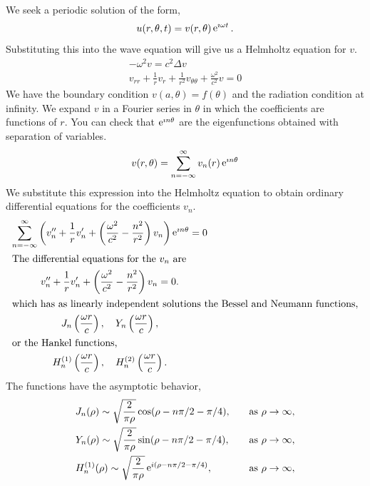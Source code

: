 {%
\begin{Solution}
  We seek a periodic solution of the form,
  \[
  u(r, \theta, t) = v(r, \theta) \mathop{\mathrm{e}}\nolimits^{\imath \omega t}.
  \]
  Substituting this into the wave equation will give us a Helmholtz equation for
  $v$.
  \begin{gather*}
    - \omega^2 v = c^2 \Delta v \\
    v_{r r} + \frac{1}{r} v_r + \frac{1}{r^2} v_{\theta\theta} 
    + \frac{\omega^2}{c^2} v = 0
  \end{gather*}
  We have the boundary condition $v(a, \theta) = f(\theta)$ and the radiation
  condition at infinity.  We expand $v$ in a Fourier series in $\theta$ in
  which the coefficients are functions of $r$.  You can check that 
  $\mathop{\mathrm{e}}\nolimits^{\imath n \theta}$ are the eigenfunctions obtained with separation of 
  variables.
  \[
  v(r, \theta) = \sum_{n = -\infty}^\infty v_n(r) \mathop{\mathrm{e}}\nolimits^{\imath n \theta}
  \]
  We substitute this expression into the Helmholtz equation to obtain ordinary
  differential equations for the coefficients $v_n$.
  \begin{gather*}
    \sum_{n = -\infty}^\infty \left( v_n'' + \frac{1}{r} v_n' + \left( \frac{\omega^2}{c^2}
        - \frac{n^2}{r^2} \right) v_n \right) \mathop{\mathrm{e}}\nolimits^{\imath n \theta} = 0 \\
    \intertext{The differential equations for the $v_n$ are}
    v_n'' + \frac{1}{r} v_n' + \left( \frac{\omega^2}{c^2} - \frac{n^2}{r^2}
    \right) v_n = 0. \\
    \intertext{which has as linearly independent solutions the Bessel and 
      Neumann functions,}
    J_n \left( \frac{\omega r}{c} \right), \quad 
    Y_n \left( \frac{\omega r}{c} \right), \\
    \intertext{or the Hankel functions,}
    H_n^{(1)} \left( \frac{\omega r}{c} \right), \quad 
    H_n^{(2)} \left( \frac{\omega r}{c} \right). 
  \end{gather*}
  The functions have the asymptotic behavior,
  \begin{alignat*}{2}
    &J_n(\rho) \sim \sqrt{ \frac{2}{\pi\rho} } \cos(\rho - n \pi/2 - \pi/4), \quad
    &\mathrm{as}\ \rho \to \infty, \\
    &Y_n(\rho) \sim \sqrt{ \frac{2}{\pi\rho} } \sin(\rho - n \pi/2 - \pi/4), \quad
    &\mathrm{as}\ \rho \to \infty, \\
    &H_n^{(1)}(\rho) \sim \sqrt{ \frac{2}{\pi\rho} } \e^{i(\rho - n \pi/2 - \pi/4)}
    ,\quad &\mathrm{as}\ \rho \to \infty, \\

\end{alignat*}
\end{Solution}}

